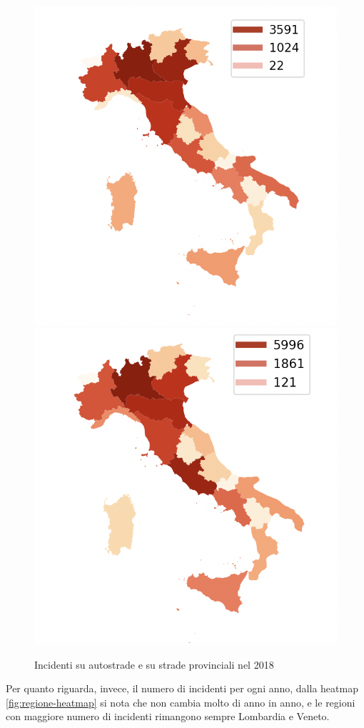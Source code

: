 \documentclass[a4paper]{report}
\begin{document}
\begin{figure}
    \includegraphics[width=0.5\linewidth]{../src/incidenti/incidenti_aci/mappe_regioni/incidenti_per_regione.png}
    \includegraphics[width=0.5\linewidth]{../src/incidenti/incidenti_aci/mappe_regioni/incidenti_regione_autostrade.png}
    \caption{Incidenti su autostrade e su strade provinciali nel 2018}
    \label{fig:incidenti-per-regione}
\end{figure}

Per quanto riguarda, invece, il numero di incidenti per ogni anno, 
dalla heatmap \ref{fig:regione-heatmap} 
si nota che non cambia molto di anno in anno, e le regioni con maggiore numero di incidenti rimangono 
sempre Lombardia e Veneto.
\end{document}
